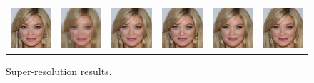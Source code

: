 \begin{figure}[ht]
\begin{center}
\begin{tabular}{cccccc}
        \includegraphics[width=.15\textwidth]{Chapter2/samples/super-resolution/table/3/x.png} &   
        \includegraphics[width=.15\textwidth]{Chapter2/samples/super-resolution/table/3/y.png} &
        \includegraphics[width=.15\textwidth]{Chapter2/samples/super-resolution/table/3/hcflow.png} &
        \includegraphics[width=.15\textwidth]{Chapter2/samples/super-resolution/table/3/sr3.png} & 
        \includegraphics[width=.15\textwidth]{Chapter2/samples/super-resolution/table/3/Song.png} &
        \includegraphics[width=.15\textwidth]{Chapter2/samples/super-resolution/table/3/DV.png} \\
      \end{tabular}
      \endgroup
    \end{center}
    \caption{Super-resolution results.}
    \label{ch2:fig:super-resolution}
  \end{figure}
  

